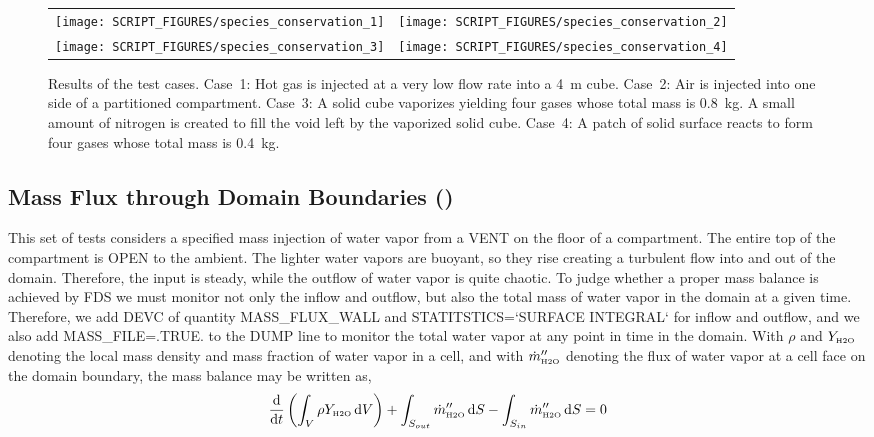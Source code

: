 \documentclass[11pt]{book}
\begin{document}
\begin{figure}[ht]
\begin{tabular*}{\textwidth}{lr}
\texttt{[image: SCRIPT\_FIGURES/species\_conservation\_1]} &
\texttt{[image: SCRIPT\_FIGURES/species\_conservation\_2]} \\
\texttt{[image: SCRIPT\_FIGURES/species\_conservation\_3]} &
\texttt{[image: SCRIPT\_FIGURES/species\_conservation\_4]}
\end{tabular*}
\caption[The  test cases]{Results of the  test cases. Case~1: Hot gas is injected at a very low flow rate into a 4~m cube. Case~2: Air is injected into one side of a partitioned compartment. Case~3: A solid cube vaporizes yielding four gases whose total mass is 0.8~kg. A small amount of nitrogen is created to fill the void left by the vaporized solid cube. Case~4: A patch of solid surface reacts to form four gases whose total mass is 0.4~kg.}
\label{species_conservation}
\end{figure}

\subsection{Mass Flux through Domain Boundaries (\texorpdfstring{}{mass\_flux\_wall})}
\label{mass_flux_wall}

This set of tests considers a specified mass injection of water vapor from a {\ct VENT} on the floor of a compartment.  The entire top of the compartment is {\ct OPEN} to the ambient.  The lighter water vapors are buoyant, so they rise creating a turbulent flow into and out of the domain.  Therefore, the input is steady, while the outflow of water vapor is quite chaotic.  To judge whether a proper mass balance is achieved by FDS we must monitor not only the inflow and outflow, but also the total mass of water vapor in the domain at a given time.  Therefore, we add {\ct DEVC} of quantity {\ct MASS\_FLUX\_WALL} and {\ct STATITSTICS=`SURFACE INTEGRAL`} for inflow and outflow, and we also add {\ct MASS\_FILE=.TRUE.} to the {\ct DUMP} line to monitor the total water vapor at any point in time in the domain.  With $\rho$ and $Y_{\mbox{\tiny H2O}}$ denoting the local mass density and mass fraction of water vapor in a cell, and with $\dot{m}_{\mbox{\tiny H2O}}^{\prime\prime}$ denoting the flux of water vapor at a cell face on the domain boundary, the mass balance may be written as,
\begin{equation}
\label{eq:H2O_mass_balance}
\frac{\mbox{d}}{\mbox{d}t} \left( \int_{V} \rho Y_{\mbox{\tiny H2O}} \,\mbox{d}V \right) + \int_{S_{out}} \dot{m}_{\mbox{\tiny H2O}}^{\prime\prime} \,\mbox{d}S - \int_{S_{in}} \dot{m}_{\mbox{\tiny H2O}}^{\prime\prime} \,\mbox{d}S = 0
\end{equation}
\end{document}
